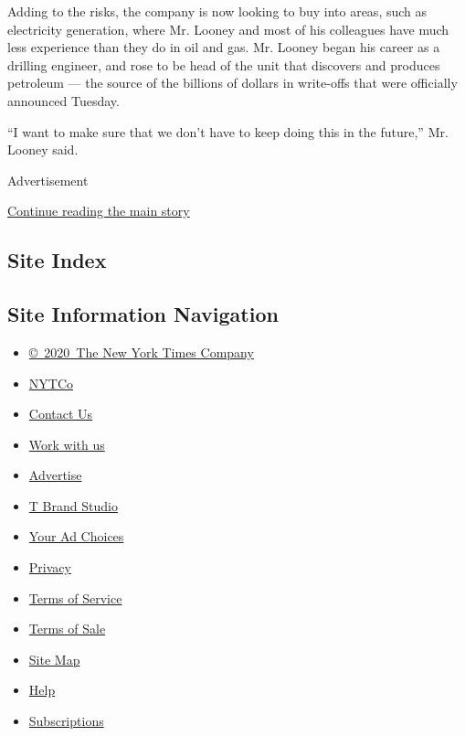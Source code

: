 Adding to the risks, the company is now looking to buy into areas, such
as electricity generation, where Mr. Looney and most of his colleagues
have much less experience than they do in oil and gas. Mr. Looney began
his career as a drilling engineer, and rose to be head of the unit that
discovers and produces petroleum --- the source of the billions of
dollars in write-offs that were officially announced Tuesday.

``I want to make sure that we don't have to keep doing this in the
future,'' Mr. Looney said.

Advertisement

\protect\hyperlink{after-bottom}{Continue reading the main story}

\hypertarget{site-index}{%
\subsection{Site Index}\label{site-index}}

\hypertarget{site-information-navigation}{%
\subsection{Site Information
Navigation}\label{site-information-navigation}}

\begin{itemize}
\tightlist
\item
  \href{https://help.nytimes3xbfgragh.onion/hc/en-us/articles/115014792127-Copyright-notice}{©~2020~The
  New York Times Company}
\end{itemize}

\begin{itemize}
\tightlist
\item
  \href{https://www.nytco.com/}{NYTCo}
\item
  \href{https://help.nytimes3xbfgragh.onion/hc/en-us/articles/115015385887-Contact-Us}{Contact
  Us}
\item
  \href{https://www.nytco.com/careers/}{Work with us}
\item
  \href{https://nytmediakit.com/}{Advertise}
\item
  \href{http://www.tbrandstudio.com/}{T Brand Studio}
\item
  \href{https://www.nytimes3xbfgragh.onion/privacy/cookie-policy\#how-do-i-manage-trackers}{Your
  Ad Choices}
\item
  \href{https://www.nytimes3xbfgragh.onion/privacy}{Privacy}
\item
  \href{https://help.nytimes3xbfgragh.onion/hc/en-us/articles/115014893428-Terms-of-service}{Terms
  of Service}
\item
  \href{https://help.nytimes3xbfgragh.onion/hc/en-us/articles/115014893968-Terms-of-sale}{Terms
  of Sale}
\item
  \href{https://spiderbites.nytimes3xbfgragh.onion}{Site Map}
\item
  \href{https://help.nytimes3xbfgragh.onion/hc/en-us}{Help}
\item
  \href{https://www.nytimes3xbfgragh.onion/subscription?campaignId=37WXW}{Subscriptions}
\end{itemize}
